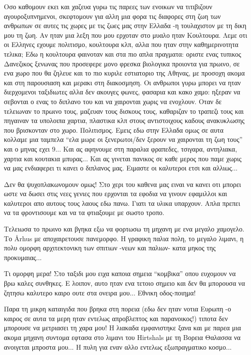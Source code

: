 Οσο καθομουν εκει και χαζευα γυρω τις παρεες των ενοικων να τιτιβιζουν αγουροξυπνημενοι, σκεφτομουν για αλλη μια φορα τις διαφορες στη ζωη των ανθρωπων σε αυτες τις χωρες με τις ζωες μας στην Ελλαδα -η τουλαχιστον με τη δικη μου τη ζωη. 
Αν ηταν μια λεξη που μου ερχοταν στο μυαλο ηταν Κουλτουρα. Λεμε οτι οι Ελληνες εχουμε πολιτισμο, κουλτουρα κλπ, αλλα που ηταν στην καθημερινοτητα τελικα; 
Εδω η κουλτουρα φαινοταν και στα πιο απλα πραγματα: οριστε ενας τυπικος Δανεζικος ξενωνας που προσεφερε μονο φρεσκα βιολογικα προιοντα για πρωινο, σε ενα χωρο που θα ζηλευε και το πιο κυριλε εστιατοριο της Αθηνας, με προσοχη ακομα και στη παρουσιαση και μερακι στη διακοσμηση. 
Οι ανθρωποι γυρω μπορει να ηταν διερχομενοι ταξιδιωτες αλλα δεν ακουγες φωνες, φασαρια και κακο χαμο: ηξεραν να σεβονται ο ενας το διπλανο του και να χαιρονται χωρις να ενοχλουν.
Οταν δε τελειωναν το πρωινο τους, μαζευαν τους δισκους τους, καθαριζαν το τραπεζι τους και πηγαιναν τα υπολοιπα χαρτια, πλαστικα κλπ στους αντιστοιχους καδους ανακυκλωσης που βρισκονταν στο χωρο. Πολιτισμος. 
Εμεις εδω στην Ελλαδα ομως σε αυτα κολλαμε μια ταμπελα ``ελα μωρε οι ξενερωτοι/δεν ξερουν να χαιρονται τη ζωη τους'' και ο μηνας εχει 9... Και ας αφηνουμε στη παραλια φραπεδες, τσιγαρα, αντηλιακα, χαρτια και κουτακια μπυρας... Και ας γινεται πανικος σε καθε μερος που παμε χωρις να μας ενδιαφερει τι κανει ο διπλανος μας. Ειμαστε οι καλυτεροι ετσι και αλλιως...

Δεν θα ψυχοπλακωνομουν ομως! Στο χερι του καθενα μας ειναι να κανει οτι μπορει ωστε να δωσει στις νεες γενιες που ερχονται τα εφοδια να γινουν εφαμιλλοι και καλυτεροι απο αυτους τους λαους εδω πανω. Γιατι τα υλικα υπαρχουν. Απλα πρεπει να τα φροντισουμε και να τα φτιαξουμε με σωστο τροπο. 

Τελειωσα το πρωινο και βγηκα εξω να φορτωσω τη μηχανη με ενα μεγαλο χαμογελο. 
Το Århus με αποχαιρετουσε πανεμορφο. Η γραφικη παλια πολη, το μεγαλο λιμανι, η πολυ ομορφη αρχιτεκτονικη των σπιτιων -νεων και παλιων- κατα μηκος της προκυμαιας...


Τι ομορφη μερα! Στο ταξιδι μου ειχα καποια σημεια ``κομβικα'' οπου ευχομουν να βρω καλες συνθηκες. Ε λοιπον, αυτο ηταν ενα τετοιο σημειο και δεν θα μπορουσα να ζητησω καλυτερο καιρο ουτε στα ονειρα μου...
Εθνικη οδος-ποιημα!


Παρα τη μικρη καταιγιδα που βρηκα στη πορεια (εδω δεν ηταν νοτια Ευρωπη -ο καιρος σε αυτα τα μερη ηταν εντελως απροβλεπτος και παρανοικος!) τιποτα δεν μπορουσε να μετριασει τη χαρα μου! Η λιακαδα εμφανιστηκε ξανα και με παρεα μια ακομα μηχανη συντομα εφτασα στο λιμανι του Hirtshals με τη Βορεια Θαλασσα να ανοιγεται μπροστα μου... Η πυλη για εναν αλλο εντελως εξωπραγματικο κοσμο...

